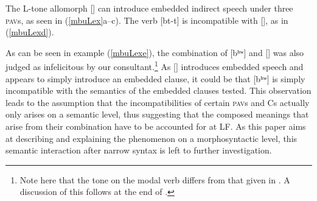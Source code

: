 \documentclass[output=paper,colorlinks,citecolor=brown]{langscibook}
\begin{document}
The L-tone allomorph [\mbuL] can introduce embedded indirect speech under three \textsc{pav}s, as seen in (\ref{mbuLex}a--c). The verb [b\epH t-t\schwaH] is incompatible with [\mbuL], as in (\ref{mbuLexd}).

\ea \label{mbuLex}
    \begin{xlist}
    \end{xlist}
\z

As can be seen in example (\ref{mbuLexe}), the combination of [bʰʷ\ooL] and [\mbuL] was also judged as infelicitous by our consultant.\footnote{Note here that the tone on the modal verb differs from that given in . A discussion of this follows at the end of .} As [\mbuL] introduces embedded speech and appears to simply introduce an embedded clause, it could be that [bʰʷ\ooL] is simply incompatible with the semantics of the embedded clauses tested. This observation leads to the assumption that the incompatibilities of certain \textsc{pav}s and Cs actually only arises on a semantic level, thus suggesting that the composed meanings that arise from their combination have to be accounted for at LF. As this paper aims at describing and explaining the phenomenon on a morphosyntactic level, this semantic interaction after narrow syntax is left to further investigation.
\end{document}

